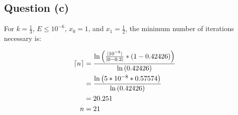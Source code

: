 	\subsection{Question (c)}

		For $k = \frac{1}{3}$, $E \le 10^{-6}$, $x_{0} = 1$, and $x_{1} = \frac{1}{2}$, the minimum number of iterations necessary is:

		\begin{align}
			\lceil n \rceil &= \frac{\ln{\left(\frac{| 10^{-8} |}{|0 - 0.2|}*\left(1-0.42426\right)\right)}}{\ln{\left(0.42426\right)}}& \notag \\
			&= \frac{\ln{\left(5*10^{-8}*0.57574\right)}}{\ln{\left(0.42426\right)}}& \notag \\
			&= 20.251& \notag \\
			n &= 21&
		\label{eq:42as}
		\end{align}